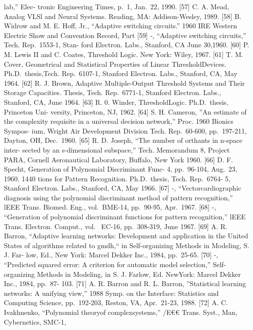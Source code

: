 lab,'' Elec- tronic Engineering Times, p.~1, Jan.~22, 1990. {[}57{]} C.
A. Mead, Analog VLSl and Neural Systems. Reading, MA: Addison-Wesley,
1989. {[}58{]} B. Widrow and M. E. Hoff, Jr., ``Adaptive switching
circuits.'' 1960 IRE Western Electric Show and Convention Record, Part
{[}59{]} -, ``Adaptive switching circuits,'' Tech. Rep.~1553-1, Stan-
ford Electron. Labs., Stanford, CA June 30,1960. {[}60{]} P. M. Lewis II
and C. Coates, Threshold Logic. New York: Wiley, 1967. {[}61{]} T. M.
Cover, Geometrical and Statistical Properties of Linear
ThresholdDevices. Ph.D.~thesis,Tech. Rep.~6107-1, Stanford Electron.
Labs., Stanford, CA, May 1964. {[}62{]} R. J. Brown, Adaptive
Multiple-Output Threshold Systems and Their Storage Capacities. Thesis,
Tech. Rep.~6771-1, Stanford Electron. Labs., Stanford, CA, June 1964.
{[}63{]} R. 0. Winder, ThresholdLogic. Ph.D.~thesis, Princeton Uni-
versity, Princeton, NJ, 1962. {[}64{]} S. H. Cameron, ''An estimate of
the complexity requisite in a universal decision network,'' Proc. 1960
Bionics Sympos- ium, Wright Air Development Division Tech. Rep.~60-600,
pp.~197-211, Dayton, OH, Dec.~1960. {[}65{]} R. D. Joseph, ``The number
of orthants in n-space inter- sected by an s-dimensional subspace,''
Tech. Memorandum 8, Project PARA, Cornell Aeronautical Laboratory,
Buffalo, New York 1960. {[}66{]} D. F. Specht, Generation of Polynomial
Discriminant Func- 4, pp.~96-104, Aug.~23, 1960. 1440 tions for Pattern
Recognition. Ph.D.~thesis, Tech. Rep.~6764- 5, Stanford Electron. Labs.,
Stanford, CA, May 1966. {[}67{]} -, ``Vectorcardiographic diagnosis
using the polynomial discriminant method of pattern recognition,'' lEEE
Trans. Biomed. Eng., vol.~BME-14, pp.~90-95, Apr.~1967. {[}68{]} -,
``Generation of polynomial discriminant functions for pattern
recognition,'' lEEE Trans. Electron. Comput., vol.~ EC-16, pp.~308-319,
June 1967. {[}69{]} A. R. Barron, ``Adaptive learning networks:
Development and application in the United States of algorithms related
to gmdh,`` in Self-organizing Methods in Modeling, S. J. Far- low, Ed.,
New York: Marcel Dekker Inc., 1984, pp.~25-65. {[}70{]} -, ``Predicted
squared error: A criterion for automatic model selection,''
Self-organizing Methods in Modeling, in S. J. Farlow, Ed. NewYork:
Marcel Dekker Inc., 1984, pp.~87- 103. {[}71{]} A. R. Barron and R. L.
Barron, ''Statistical learning networks: A unifying view,'' 1988 Symp.
on the Interface: Statistics and Computing Science, pp.~192-203, Reston,
VA, Apr.~21-23, 1988. {[}72{]} A. C. Ivakhnenko, ``Polynomial theoryof
complexsystems,'' /E€€ Trans. Syst., Man, Cybernetics, SMC-1,
